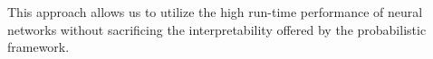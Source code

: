 \documentclass[12pt]{article}
\begin{document}
This approach allows us to utilize the high run-time performance of neural networks 
without sacrificing the interpretability offered by the probabilistic framework.

% 


% 
% 
% 
% 
% 
\end{document}
